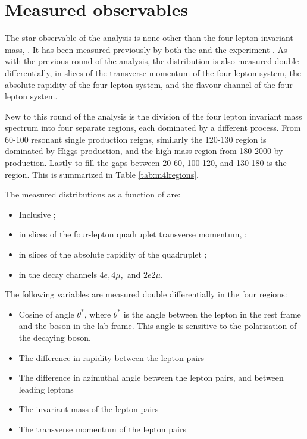 \section{Measured observables}

The star observable of the analysis is none other than the four lepton invariant mass, \mFourL. It has been measured previously by both the \ATLAS and the \CMS experiment  \cite{}. As with the previous round of the analysis, the \mFourL distribution is also measured double-differentially, in slices of the transverse momentum of the four lepton system, the absolute rapidity of the four lepton system, and the flavour channel of the four lepton system. 

New to this round of the analysis is the division of the four lepton invariant mass spectrum into four separate regions, each dominated by a different process. From \unit{60}{\GeV}-\unit{100}{\GeV} resonant single \Z production reigns, similarly the \unit{120}{\GeV}-\unit{130}{\GeV} region is dominated by Higgs production, and the high mass region from \unit{180}{\GeV}-\unit{2000}{\GeV} by \onshellZZ{} production. Lastly to fill the gaps between  \unit{20}{\GeV}-\unit{60}{\GeV}, \unit{100}{\GeV}-\unit{120}{\GeV}, and \unit{130}{\GeV}-\unit{180}{\GeV} is the \offshellZZ{} region. This is summarized in Table \ref{tab:m4lregions}. 

The measured distributions as a function of \mFourL{} are:
\begin{itemize}
    \item Inclusive \mFourL{};
    \item \mFourL{} in slices of the four-lepton quadruplet transverse momentum, \ptFourL{};
    \item \mFourL{} in slices of the absolute rapidity of the quadruplet \yFourL{};
    \item \mFourL{} in the decay channels $4e, 4\mu, $ and $2e2\mu$.
\end{itemize}
The following variables are measured double differentially in the four \mFourL{} regions:
\begin{itemize}
    \item Cosine of angle $\theta^{*}$, where $\theta^{*}$ is the angle between the  lepton in the rest frame and the \Z boson in the lab frame. This angle is sensitive to the polarisation of the decaying boson.
    \item The difference in rapidity between the lepton pairs
    \item The difference in azimuthal angle between the lepton pairs, and between leading leptons
    \item The invariant mass of the lepton pairs
    \item The transverse momentum of the lepton pairs
\end{itemize}

